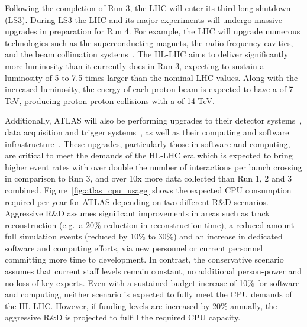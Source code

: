 Following the completion of Run 3, the LHC will enter its third long shutdown (LS3). During LS3 the LHC and its major experiments will undergo massive upgrades in preparation for Run 4. For example, the LHC will upgrade numerous technologies such as the superconducting magnets, the radio frequency cavities, and the beam collimation systems~\cite{lhc_upgrade_run4}. The HL-LHC aims to deliver significantly more luminosity than it currently does in Run 3, expecting to sustain a luminosity of 5 to 7.5 times larger than the nominal LHC values. Along with the increased luminosity,
the energy of each proton beam is expected to have a \com{} of 7 TeV, producing proton-proton collisions with a \com{} of 14 TeV. 

Additionally, ATLAS will also be performing upgrades to their detector systems~\cite{atlas_detector_upgrade_run4}, data acquisition and trigger systems~\cite{atlas_detector_upgrade_run4}, as well as their computing and software infrastructure~\cite{CERN-LHCC-2022-005}. These upgrades, particularly those in software and computing, are critical to meet the demands of the HL-LHC era which is expected to bring higher event rates with over double the number of interactions per bunch crossing in comparison to Run 3, and over 10x more data collected than Run 1, 2 and 3 combined.
Figure~\ref{fig:atlas_cpu_usage} shows the expected CPU consumption required per year for ATLAS depending on two different R\&D scenarios. Aggressive R\&D assumes significant improvements in areas such as track reconstruction (e.g.\ a 20\% reduction in reconstruction time), a reduced amount full simulation events (reduced by 10\% to 30\%) and an increase in dedicated software and computing efforts, via new personnel or current personnel committing more time to development. In contrast, the conservative scenario assumes that current staff levels remain constant, no additional person-power and no loss of key experts.
Even with a sustained budget increase of 10\% for software and computing, neither scenario is expected to fully meet the CPU demands of the HL-LHC\@. However, if funding levels are increased by 20\% annually, the aggressive R\&D is projected to fulfill the required CPU capacity.

